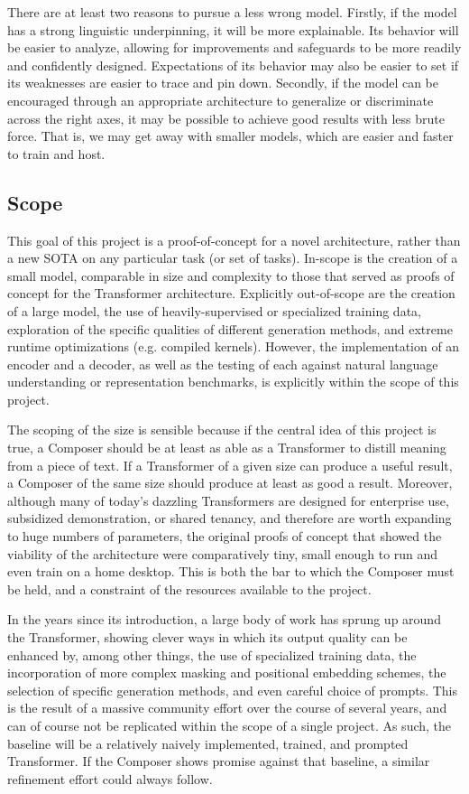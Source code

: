 \documentclass[a4paper, 12pt]{article}
\begin{document}
There are at least two reasons to pursue a less wrong model. Firstly, if the model has a strong linguistic underpinning, it will be more explainable. Its behavior will be easier to analyze, allowing for improvements and safeguards to be more readily and confidently designed. Expectations of its behavior may also be easier to set if its weaknesses are easier to trace and pin down. Secondly, if the model can be encouraged through an appropriate architecture to generalize or discriminate across the right axes, it may be possible to achieve good results with less brute force. That is, we may get away with smaller models, which are easier and faster to train and host.

\subsection{Scope}
This goal of this project is a proof-of-concept for a novel architecture, rather than a new SOTA on any particular task (or set of tasks). In-scope is the creation of a small model, comparable in size and complexity to those that served as proofs of concept for the Transformer architecture. Explicitly out-of-scope are the creation of a large model, the use of heavily-supervised or specialized training data, exploration of the specific qualities of different generation methods, and extreme runtime optimizations (e.g. compiled kernels). However, the implementation of an encoder and a decoder, as well as the testing of each against natural language understanding or representation benchmarks, is explicitly within the scope of this project.

The scoping of the size is sensible because if the central idea of this project is true, a Composer should be at least as able as a Transformer to distill meaning from a piece of text. If a Transformer of a given size can produce a useful result, a Composer of the same size should produce at least as good a result. Moreover, although many of today's dazzling Transformers are designed for enterprise use, subsidized demonstration, or shared tenancy, and therefore are worth expanding to huge numbers of parameters, the original proofs of concept that showed the viability of the architecture were comparatively tiny, small enough to run and even train on a home desktop. This is both the bar to which the Composer must be held, and a constraint of the resources available to the project.

In the years since its introduction, a large body of work has sprung up around the Transformer, showing clever ways in which its output quality can be enhanced by, among other things, the use of specialized training data, the incorporation of more complex masking and positional embedding schemes, the selection of specific generation methods, and even careful choice of prompts. This is the result of a massive community effort over the course of several years, and can of course not be replicated within the scope of a single project. As such, the baseline will be a relatively naively implemented, trained, and prompted Transformer. If the Composer shows promise against that baseline, a similar refinement effort could always follow.
\end{document}
